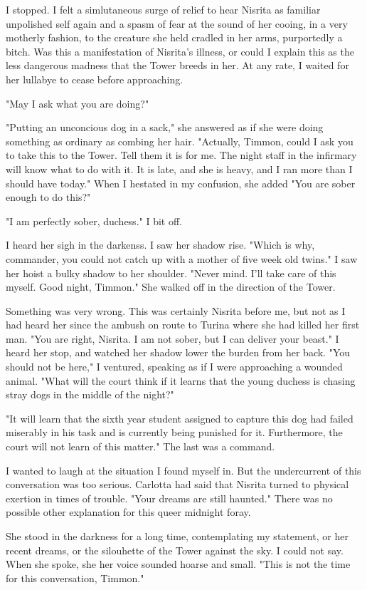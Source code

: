 \documentclass{article}
\begin{document}
I stopped. I felt a simlutaneous surge of relief to hear Nisrita as familiar unpolished self again and a spasm of fear at the sound of her cooing, in a very motherly fashion, to the creature she held cradled in her arms, purportedly a bitch. Was this a manifestation of Nisrita's illness, or could I explain this as the less dangerous madness that the Tower breeds in her. At any rate, I waited for her lullabye to cease before approaching.

"May I ask what you are doing?" 

"Putting an unconcious dog in a sack," she answered as if she were doing something as ordinary as combing her hair. "Actually, Timmon, could I ask you to take this to the Tower. Tell them it is for me. The night staff in the infirmary will know what to do with it. It is late, and she is heavy, and I ran more than I should have today." When I hestated in my confusion, she added "You are sober enough to do this?"

"I am perfectly sober, duchess." I bit off.

I heard her sigh in the darkenss. I saw her shadow rise. "Which is why, commander, you could not catch up with a mother of five week old twins." I saw her hoist a bulky shadow to her shoulder. "Never mind. I'll take care of this myself. Good night, Timmon." She walked off in the direction of the Tower.

Something was very wrong. This was certainly Nisrita before me, but not as I had heard her since the ambush on route to Turina where she had killed her first man. "You are right, Nisrita. I am not sober, but I can deliver your beast." I heard her stop, and watched her shadow lower the burden from her back. "You should not be here," I ventured, speaking as if I were approaching a wounded animal. "What will the court think if it learns that the young duchess is chasing stray dogs in the middle of the night?"

"It will learn that the sixth year student assigned to capture this dog had failed miserably in his task and is currently being punished for it. Furthermore, the court will not learn of this matter." The last was a command. 

I wanted to laugh at the situation I found myself in. But the undercurrent of this conversation was too serious. Carlotta had said that Nisrita turned to physical exertion in times of trouble. "Your dreams are still haunted." There was no possible other explanation for this queer midnight foray.

She stood in the darkness for a long time, contemplating my statement, or her recent dreams, or the silouhette of the Tower against the sky. I could not say. When she spoke, she her voice sounded hoarse and small. "This is not the time for this conversation, Timmon."
 
\end{document}
